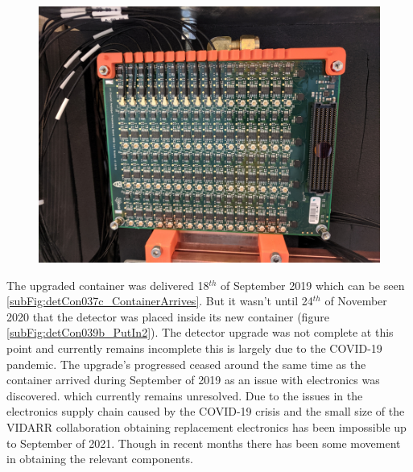 \begin{figure}[htbp]
\centering
\includegraphics[width=0.8\linewidth]{Chapter3/Figs/Raster/detCon032_ConnectedBoard.png}
\label{fig:detCon032_ConnectedBoard}
\end{figure}

The upgraded container was delivered 18$^{th}$ of September 2019 which can be seen \ref{subFig:detCon037c_ContainerArrives}. But it wasn't until 24$^{th}$ of November 2020 that the detector was placed inside its new container (figure \ref{subFig:detCon039b_PutIn2}). The detector upgrade was not complete at this point and currently remains incomplete this is largely due to the COVID-19 pandemic. The upgrade's progressed ceased around the same time as the container arrived during September of 2019 as an issue with electronics was discovered. which currently remains unresolved. Due to the issues in the electronics supply chain caused by the COVID-19 crisis and the small size of the VIDARR collaboration obtaining replacement electronics has been impossible up to September of 2021. Though in recent months there has been some movement in obtaining the relevant components. 

